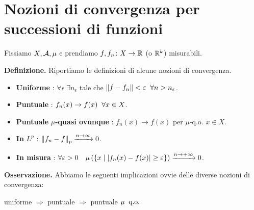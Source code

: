 %
%

\section{Nozioni di convergenza per successioni di funzioni}
Fissiamo $X,\mathcal{A},\mu$ e prendiamo $f, f_n \colon X \to \mathbb R$ (o $\mathbb R^k$) misurabili.

\textbf{Definizione.}
Riportiamo le definizioni di alcune nozioni di convergenza.

\begin{itemize}

\item \textbf{Uniforme} : $\forall \epsilon \; \exists n_{\epsilon}$ tale che $\left\lVert f - f_n \right\rVert < \varepsilon \;\; \forall n > n_\varepsilon$.

\item \textbf{Puntuale} : $f_n(x) \to f(x) \;\; \forall x \in X$.

\item \textbf{Puntuale} $\mu$\textbf{-quasi ovunque} : $f_n(x) \to f(x)$ per $\mu$-q.o. $x \in X$.

\item \textbf{In} $L^p$ : $\left\lVert f_n - f \right\rVert_p \xrightarrow{n \to \infty} 0$.

\item \textbf{In misura} : $\displaystyle \forall \varepsilon > 0 \quad \mu \left( \left\{ x \;\middle|\; \left| f_n(x) - f(x) \right| \geq \varepsilon \right\} \right) \xrightarrow{n \to +\infty} 0$.

\end{itemize}

\textbf{Osservazione.}
Abbiamo le seguenti implicazioni ovvie delle diverse nozioni di convergenza:

\begin{center}
	uniforme $\Rightarrow$ puntuale $\Rightarrow$ puntuale $\mu \;\;\text{q.o.}$
\end{center}

